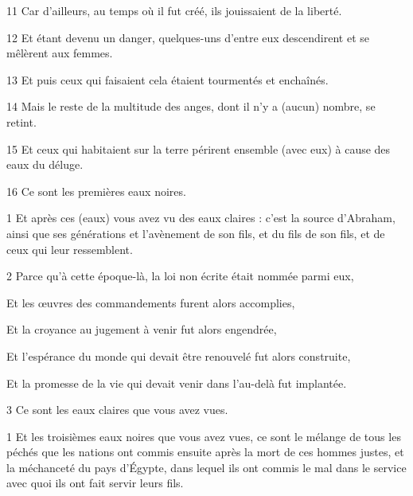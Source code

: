 \par 11 Car d'ailleurs, au temps où il fut créé, ils jouissaient de la liberté.

\par 12 Et étant devenu un danger, quelques-uns d'entre eux descendirent et se mêlèrent aux femmes.

\par 13 Et puis ceux qui faisaient cela étaient tourmentés et enchaînés.

\par 14 Mais le reste de la multitude des anges, dont il n'y a (aucun) nombre, se retint.

\par 15 Et ceux qui habitaient sur la terre périrent ensemble (avec eux) à cause des eaux du déluge.

\par 16 Ce sont les premières eaux noires.


\par 1 Et après ces (eaux) vous avez vu des eaux claires : c'est la source d'Abraham, ainsi que ses générations et l'avènement de son fils, et du fils de son fils, et de ceux qui leur ressemblent.

\par 2 Parce qu'à cette époque-là, la loi non écrite était nommée parmi eux,

\par Et les œuvres des commandements furent alors accomplies,

\par Et la croyance au jugement à venir fut alors engendrée,

\par Et l'espérance du monde qui devait être renouvelé fut alors construite,

\par Et la promesse de la vie qui devait venir dans l'au-delà fut implantée.

\par 3 Ce sont les eaux claires que vous avez vues.


\par 1 Et les troisièmes eaux noires que vous avez vues, ce sont le mélange de tous les péchés que les nations ont commis ensuite après la mort de ces hommes justes, et la méchanceté du pays d'Égypte, dans lequel ils ont commis le mal dans le service avec quoi ils ont fait servir leurs fils.

